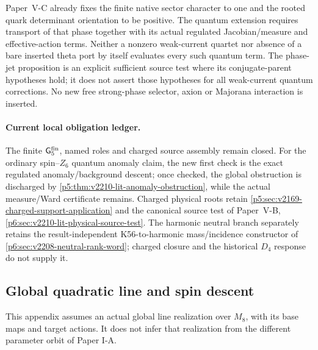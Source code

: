\documentclass[12pt,a4paper]{article}
\begin{document}
\begin{remark}
\label{p5:rem:v2210-lit-finite-cp-retained}
Paper~V-C already fixes the finite native sector character to one and the
rooted quark determinant orientation to be positive.  The quantum extension
requires transport of that phase together with its actual regulated
Jacobian/measure and effective-action terms.  Neither a nonzero weak-current
quartet nor absence of a bare inserted theta port by itself evaluates every
such quantum term.  The phase-jet proposition is an explicit sufficient
source test where its conjugate-parent hypotheses hold; it does not assert
those hypotheses for all weak-current quantum corrections.  No new free
strong-phase selector, axion or Majorana interaction is inserted.
\end{remark}

\paragraph{Current local obligation ledger.}
The finite \(\mathsf G_5^{\rm fin}\), named roles and charged source
assembly remain closed.  For the ordinary spin--\(Z_6\) quantum anomaly
claim, the new first check is the exact regulated anomaly/background descent;
once checked, the global obstruction is discharged by
\ref{p5:thm:v2210-lit-anomaly-obstruction}, while the actual measure/Ward
certificate remains.  Charged physical roots retain
\ref{p5:sec:v2169-charged-support-application} and the canonical source test
of Paper~V-B, \ref{p6:sec:v2210-lit-physical-source-test}.  The harmonic
neutral branch separately retains the result-independent K56-to-harmonic
mass/incidence constructor of
\ref{p6:sec:v2208-neutral-rank-word}; charged closure and the historical
\(D_4\) response do not supply it.


\subsection{Global quadratic line and spin descent}
\label{p5:app:global-quadratic-line-spin-descent}

This appendix assumes an actual global line realization
over \(M_8\), with its base maps and target actions.
It does not infer that realization from the different
parameter orbit of Paper I-A.
\end{document}
